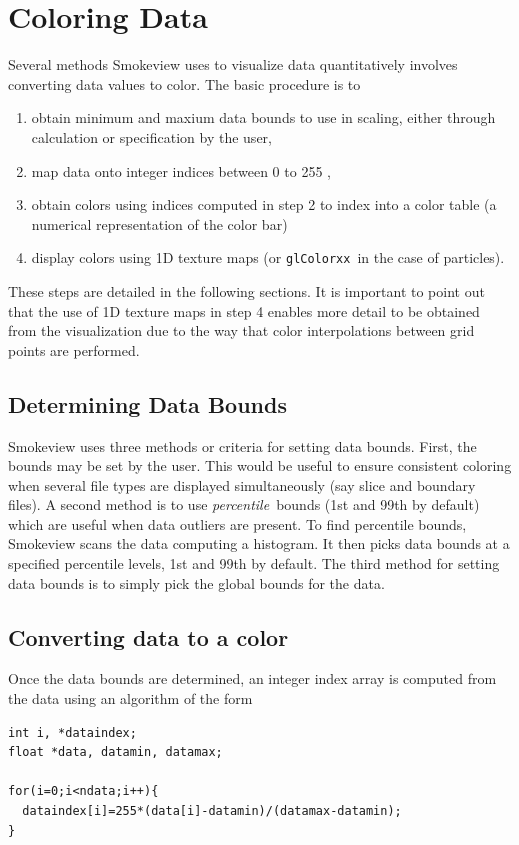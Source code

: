 \documentclass[11pt,twoside]{book}
\begin{document}
\chapter{Coloring Data}
Several methods Smokeview uses to visualize data quantitatively involves converting data values to color.
The basic procedure is to
\begin{enumerate}
\item obtain minimum and maxium data bounds to use in scaling, either through calculation or specification by the user,
\item map data onto integer indices between 0 to 255 ,
\item obtain colors using indices computed in step 2 to index into a color table (a numerical representation of the color bar)
\item display colors using 1D texture maps (or {\tt glColorxx}\ in the case of particles).
\end{enumerate}
These steps are detailed in the following sections.   It is important to point out that the use of 1D texture maps in step 4 enables more detail to be obtained from the visualization due to the way that color interpolations between grid points are performed.

\section{Determining Data Bounds}Smokeview uses three methods or criteria for setting data bounds.  First, the bounds may be set by the user.  This would be useful to ensure consistent coloring when several file types are displayed simultaneously (say slice and boundary files).  A second method is to use {\em percentile}\ bounds (1st and 99th by default) which are useful when data outliers are present.  To find percentile bounds, Smokeview scans the data computing a histogram.  It then picks data bounds at a specified percentile levels, 1st and 99th by default.  The third method for setting data bounds is to simply pick the global bounds for the data.

\section{Converting data to a color}
Once the data bounds are determined, an integer index array is computed from the data using an algorithm of the form
\begin{verbatim}
int i, *dataindex;
float *data, datamin, datamax;

for(i=0;i<ndata;i++){
  dataindex[i]=255*(data[i]-datamin)/(datamax-datamin);
}
\end{verbatim}
\end{document}
